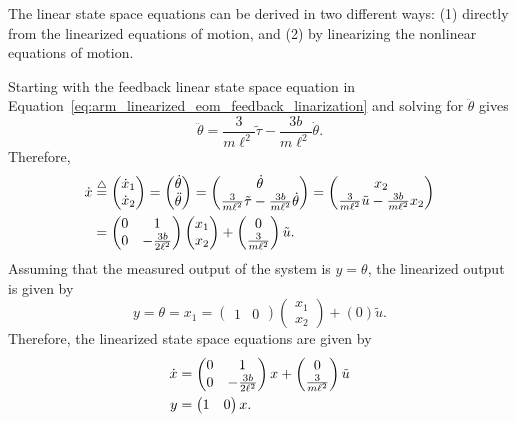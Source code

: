 
The linear state space equations can be derived in two different ways: (1) directly from the linearized equations of motion, and (2) by linearizing the nonlinear equations of motion.

Starting with the feedback linear state space equation in Equation~\eqref{eq:arm_linearized_eom_feedback_linarization} and solving for $\ddot{\theta}$ gives
\[
\ddot{\theta} = \frac{3}{m\ell^2}\tilde{\tau} - \frac{3b}{m\ell^2}\dot{\theta}.
\]
Therefore,
\begin{align*}
\dot{x} &\stackrel{\triangle}{=} \begin{pmatrix} \dot{x}_1 \\ \dot{x}_2 \end{pmatrix} 
= \begin{pmatrix}\dot{\theta} \\ \ddot{\theta}\end{pmatrix} 
= \begin{pmatrix} \dot{\theta} \\ \frac{3}{m\ell^2}\tilde{\tau} - \frac{3b}{m\ell^2}\dot{\theta}  \end{pmatrix}
=\begin{pmatrix} x_2 \\ \frac{3}{m\ell^2}\tilde{u} - \frac{3b}{m\ell^2}x_2  \end{pmatrix} \\
&= \begin{pmatrix} 0 & 1 \\ 0 & -\frac{3b}{2\ell^2} \end{pmatrix} \begin{pmatrix} x_1 \\ x_2 \end{pmatrix} + \begin{pmatrix} 0 \\ \frac{3}{m\ell^2} \end{pmatrix} \tilde{u}.
\end{align*}
Assuming that the measured output of the system is $y=\theta$, the linearized output is given by
\[
y = \theta = x_1 = \begin{pmatrix} 1 & 0\end{pmatrix}\begin{pmatrix}x_1 \\ x_2 \end{pmatrix} + (0)\tilde{u}.
\]
Therefore, the linearized state space equations are given by
\begin{align}
\dot{x} &= \begin{pmatrix} 0 & 1 \\ 0 & -\frac{3b}{2\ell^2} \end{pmatrix} x + \begin{pmatrix} 0 \\ \frac{3}{m\ell^2} \end{pmatrix} \tilde{u} 
\notag \\
y &= \begin{pmatrix} 1 & 0\end{pmatrix} x.
\label{eq:dm_arm_linearized_ss}
\end{align}


